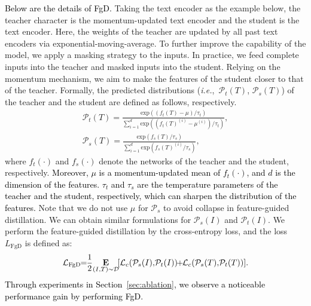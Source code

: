 \documentclass[sigconf]{acmart}
\def\ie{\mbox{\textit{i.e.}, }}
\def\mD{{\mathcal D}}
\def\mL{{\mathcal L}}
\def\mP{{\mathcal P}}
\def\mmE{{\textbf E}}
\def\xie{\textcolor{black}}
\def\mmxie{\textcolor{black}}
\def\mmljc{\textcolor{black}}
\begin{document}
\mmljc{Below are the details of FgD.}
Taking the text encoder as the example below, the teacher character is the momentum-updated text encoder and the student is the text encoder. Here, the weights of the teacher are updated by all past text encoders via exponential-moving-average. 
To further improve the capability of the model, we apply a masking strategy to the inputs. In practice, we feed complete inputs into the teacher and masked inputs into the student. 
Relying on the momentum mechanism, we aim to make the features of the student closer to that of the teacher.
Formally, the predicted distributions (\ie $\mP_t(T)$, $\mP_s(T)$) of the teacher and the student are defined as follows, 
respectively.
\begin{equation}
    \begin{aligned}
    \label{FgD_Eqn}
    \mP_t(T) = \frac{\text{exp}((f_t(T)-\mu)/\tau_t)}{\sum_{i=1}^d \text{exp}((f_t(T)^{(i)}-\mu^{(i)})/\tau_t)}, \\
    \!\!\!\!\!\!\!\!\!\!\!\!\!\!\!\!\!\!\!\mP_s(T) = \frac{\text{exp}(f_s(T)/\tau_s)}{\sum_{i=1}^d \text{exp}(f_s(T)^{(i)}/\tau_s)},
    \end{aligned}
\end{equation}
where $f_t(\cdot)$ and $f_s(\cdot)$ denote the networks of the teacher and the student, respectively. \xie{Moreover, $\mu$ is a momentum-updated mean of $f_t(\cdot)$, and $d$ is the dimension of the features. $\tau_t$ and $\tau_s$ are the temperature parameters of the teacher and the student, respectively, which can
sharpen the distribution of the features.}
Note that we do not use $\mu$ for $\mP_s$ to avoid collapse in feature-guided distillation. We can obtain similar formulations for $\mP_s(I)$ and $\mP_t(I)$. We perform the feature-guided distillation by the cross-entropy loss, and the loss $L_{\text{FgD}}$ is defined as:
\begin{align}
    \!\mL_{\text{FgD}}\!\!=\!\!\frac{1}{2}\!\mathop{\mmE}_{(I,T){\sim} \mD} \![\mL_c(\mP_s(I),\!\mP_t(I))\!\!+\!\!\mL_c(\mP_s(T),\!\mP_t(T))].\!
\end{align}
\mmxie{Through experiments in Section~\ref{sec:ablation}, we observe
a noticeable performance gain by performing FgD.}
\end{document}
